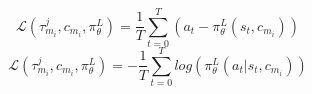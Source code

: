 
\begin{equation}
    \label{eq:mse}
    \mathcal{L}(\tau_{m_{i}}^{j}, c_{m_{i}},\pi^{L}_{\theta}) = \frac{1}{T}\sum_{t=0}^{T} (a_{t} - \pi^{L}_{\theta}(s_{t}, c_{m_{i}}))
\end{equation}
\begin{equation}
    \label{eq:nll}
    \mathcal{L}(\tau_{m_{i}}^{j}, c_{m_{i}},\pi^{L}_{\theta}) = - \frac{1}{T}\sum_{t=0}^{T} log(\pi^{L}_{\theta}(a_{t}|s_{t}, c_{m_{i}}))
\end{equation}